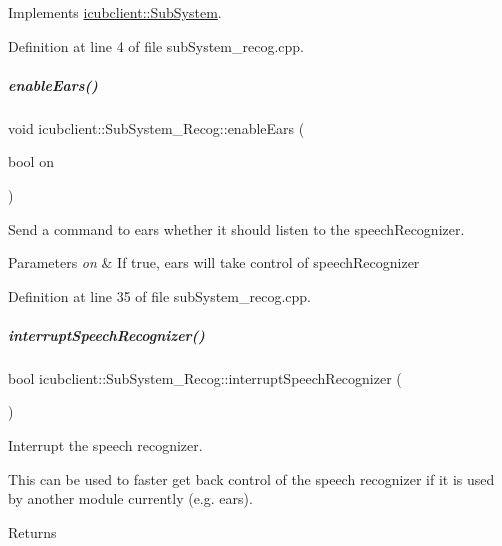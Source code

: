 Implements \hyperlink{group__icubclient__subsystems_a5fc84b6e51ec56f91323280b7da52dc8}{icubclient\+::\+Sub\+System}.



Definition at line 4 of file sub\+System\+\_\+recog.\+cpp.

\mbox{\label{group__icubclient__subsystems_a7ed85c0ef3ec62ea019c8d8e0f674728}} 
\subparagraph{\texorpdfstring{enable\+Ears()}{enableEars()}}
{\footnotesize\ttfamily void icubclient\+::\+Sub\+System\+\_\+\+Recog\+::enable\+Ears (\begin{DoxyParamCaption}\item[{bool}]{on }\end{DoxyParamCaption})}



Send a command to ears whether it should listen to the speech\+Recognizer. 


\begin{DoxyParams}{Parameters}
{\em on} & If true, ears will take control of speech\+Recognizer \\
\hline
\end{DoxyParams}


Definition at line 35 of file sub\+System\+\_\+recog.\+cpp.

\mbox{\label{group__icubclient__subsystems_ae69feadf3793487af1bd5649c387f0c0}} 
\subparagraph{\texorpdfstring{interrupt\+Speech\+Recognizer()}{interruptSpeechRecognizer()}}
{\footnotesize\ttfamily bool icubclient\+::\+Sub\+System\+\_\+\+Recog\+::interrupt\+Speech\+Recognizer (\begin{DoxyParamCaption}{ }\end{DoxyParamCaption})}



Interrupt the speech recognizer. 

This can be used to faster get back control of the speech recognizer if it is used by another module currently (e.\+g. ears). \begin{DoxyReturn}{Returns}

\end{DoxyReturn}


